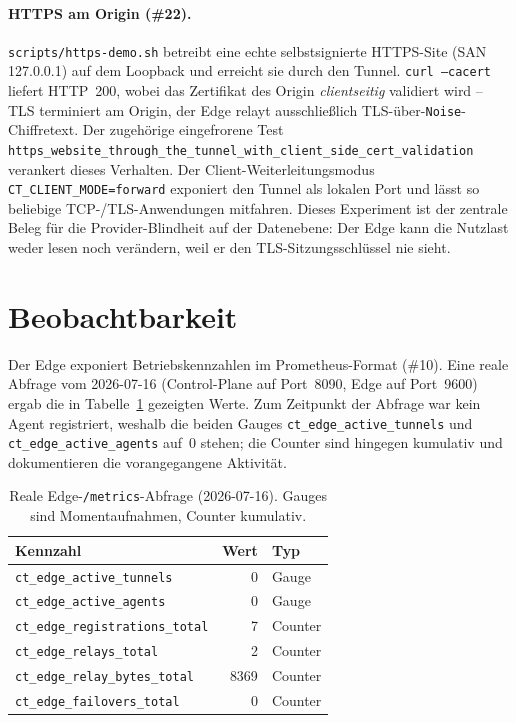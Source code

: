 \paragraph{HTTPS am Origin (\#22).} \texttt{scripts/https-demo.sh} betreibt eine
echte selbstsignierte HTTPS-Site (SAN 127.0.0.1) auf dem Loopback und erreicht
sie durch den Tunnel. \texttt{curl --cacert} liefert HTTP~200, wobei das
Zertifikat des Origin \emph{clientseitig} validiert wird -- TLS terminiert am
Origin, der Edge relayt ausschließlich TLS-über-\texttt{Noise}-Chiffretext. Der
zugehörige eingefrorene Test
\texttt{https\_website\_through\_the\_tunnel\_with\_client\_side\_cert\_validation}
verankert dieses Verhalten. Der Client-Weiterleitungsmodus
\texttt{CT\_CLIENT\_MODE=forward} exponiert den Tunnel als lokalen Port und lässt
so beliebige TCP-/TLS-Anwendungen mitfahren. Dieses Experiment ist der zentrale
Beleg für die Provider-Blindheit auf der Datenebene: Der Edge kann die
Nutzlast weder lesen noch verändern, weil er den TLS-Sitzungsschlüssel nie
sieht.

\section{Beobachtbarkeit}
\label{sec:beobachtbarkeit}

Der Edge exponiert Betriebskennzahlen im Prometheus-Format (\#10). Eine reale
Abfrage vom 2026-07-16 (Control-Plane auf Port~8090, Edge auf Port~9600) ergab
die in Tabelle~\ref{tab:metrics} gezeigten Werte. Zum Zeitpunkt der Abfrage war
kein Agent registriert, weshalb die beiden Gauges \texttt{ct\_edge\_active\_tunnels}
und \texttt{ct\_edge\_active\_agents} auf~0 stehen; die Counter sind hingegen
kumulativ und dokumentieren die vorangegangene Aktivität.

\begin{table}[t]
  \centering
  \caption{Reale Edge-\texttt{/metrics}-Abfrage (2026-07-16). Gauges sind
    Momentaufnahmen, Counter kumulativ.}
  \label{tab:metrics}
  \begin{tabular}{lrl}
    \toprule
    Kennzahl & Wert & Typ \\
    \midrule
    \texttt{ct\_edge\_active\_tunnels} & 0 & Gauge \\
    \texttt{ct\_edge\_active\_agents} & 0 & Gauge \\
    \texttt{ct\_edge\_registrations\_total} & 7 & Counter \\
    \texttt{ct\_edge\_relays\_total} & 2 & Counter \\
    \texttt{ct\_edge\_relay\_bytes\_total} & 8369 & Counter \\
    \texttt{ct\_edge\_failovers\_total} & 0 & Counter \\
    \bottomrule
  \end{tabular}
\end{table}

